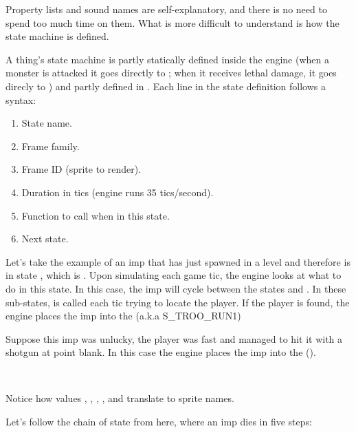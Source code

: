 Property lists and sound names are self-explanatory, and there is no need to spend too much time on them. What is more difficult to understand is how the state machine is defined.\\
\par
A thing's state machine is partly statically defined inside the engine (when a monster is attacked it goes directly to ; when it receives lethal damage, it goes direcly to ) and partly defined in . Each line in the state definition follows a syntax:
\begin{enumerate}
\item State name.
\item Frame family.
\item Frame ID (sprite to render).
\item Duration in tics (engine runs 35 tics/second).
\item Function to call when in this state.
\item Next state.
\end{enumerate}
\par
\vspace{5pt}
Let's take the example of an imp that has just spawned in a level and therefore is in state , which is . Upon simulating each game tic, the engine looks at what to do in this state. In this case, the imp will cycle between the states  and . In these sub-states,  is called each tic trying to locate the player. If the player is found, the engine places the imp into the  (a.k.a S\_TROO\_RUN1)\\
\par

Suppose this imp was unlucky, the player was fast and managed to hit it with a shotgun at point blank. In this case the engine places the imp into the  ().\\
\par
{}\\
\par
Notice how values , , , , and  translate to sprite names.\\
\par
{}
\vspace{-10pt}
Let's follow the chain of state from here, where an imp dies in five steps:

